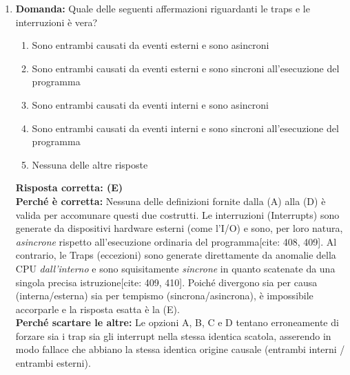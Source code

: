 \documentclass[12pt, a4paper]{article}
\begin{document}
\begin{enumerate}
    \item \textbf{Domanda:} Quale delle seguenti affermazioni riguardanti le traps e le interruzioni è vera?
    \begin{enumerate}[label=(\Alph*)]
        \item Sono entrambi causati da eventi esterni e sono asincroni
        \item Sono entrambi causati da eventi esterni e sono sincroni all'esecuzione del programma
        \item Sono entrambi causati da eventi interni e sono asincroni
        \item Sono entrambi causati da eventi interni e sono sincroni all'esecuzione del programma
        \item Nessuna delle altre risposte
    \end{enumerate}
    \textbf{Risposta corretta: (E)} \\
    \textbf{Perché è corretta:} Nessuna delle definizioni fornite dalla (A) alla (D) è valida per accomunare questi due costrutti. Le interruzioni (Interrupts) sono generate da dispositivi hardware esterni (come l'I/O) e sono, per loro natura, \textit{asincrone} rispetto all'esecuzione ordinaria del programma[cite: 408, 409]. Al contrario, le Traps (eccezioni) sono generate direttamente da anomalie della CPU \textit{dall'interno} e sono squisitamente \textit{sincrone} in quanto scatenate da una singola precisa istruzione[cite: 409, 410]. Poiché divergono sia per causa (interna/esterna) sia per tempismo (sincrona/asincrona), è impossibile accorparle e la risposta esatta è la (E). \\
    \textbf{Perché scartare le altre:} Le opzioni A, B, C e D tentano erroneamente di forzare sia i trap sia gli interrupt nella stessa identica scatola, asserendo in modo fallace che abbiano la stessa identica origine causale (entrambi interni / entrambi esterni).


\end{enumerate}
\end{document}
